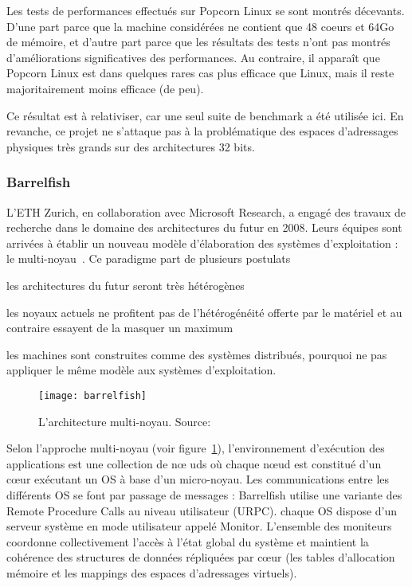       Les tests de performances effectués sur Popcorn Linux se sont montrés
      décevants. D'une part parce que la machine considérées ne contient que
      48
      coeurs et 64Go de mémoire, et d'autre part parce que les résultats des
      tests n'ont pas montrés d'améliorations significatives des
      performances. Au contraire, il apparaît que Popcorn Linux est dans
      quelques rares cas plus efficace que Linux, mais il reste majoritairement
      moins efficace (de peu).

      Ce résultat est à relativiser, car une seul suite de benchmark a été
      utilisée ici. En revanche, ce projet ne s'attaque pas à la problématique
      des espaces d'adressages physiques très grands sur des architectures 32
      bits.


    \subsubsection{Barrelfish}
      
      L’ETH Zurich, en collaboration avec Microsoft Research, a engagé des
      travaux de recherche dans le domaine des architectures du futur en
      2008. Leurs équipes sont arrivées à établir un nouveau modèle
      d’élaboration des systèmes d’exploitation : le
      multi-noyau~\citep{schupbach2008embracing}. Ce paradigme part de plusieurs
      postulats\benumline \item les architectures du futur seront très
      hétérogènes \item les noyaux actuels ne profitent pas de l’hétérogénéité
      offerte par le matériel et au contraire essayent de la masquer un maximum
      \item les machines sont construites comme des systèmes distribués,
        pourquoi ne pas appliquer le même modèle aux systèmes
        d’exploitation\eenumline.

      \begin{figure}
        \centering \texttt{[image: barrelfish]}
        \caption{L'architecture multi-noyau. Source:
          \citeauthor{schupbach2008embracing}}
        \label{fig:barrelfish}
      \end{figure}
        
      Selon l’approche multi-noyau (voir figure~\ref{fig:barrelfish}),
      l'environnement d’exécution des applications est une collection de n\oe
      uds où chaque n\oe ud est constitué d’un c\oe ur exécutant un OS à base
      d’un micro-noyau. Les communications entre les différents OS se font par
      passage de messages : Barrelfish utilise une variante des Remote Procedure
      Calls au niveau utilisateur (URPC). chaque OS dispose d’un serveur système
      en mode utilisateur appelé Monitor. L’ensemble des moniteurs coordonne
      collectivement l’accès à l’état global du système et maintient la
      cohérence des structures de données répliquées par c\oe ur (les tables
      d’allocation mémoire et les mappings des espaces d’adressages
      virtuels).\newline

